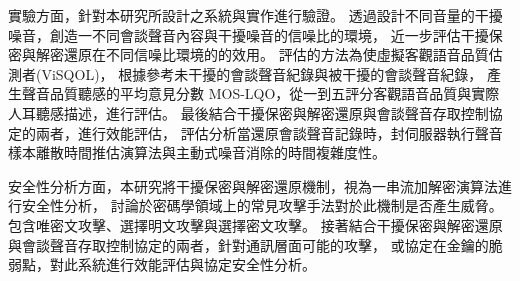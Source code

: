     實驗方面，針對本研究所設計之系統與實作進行驗證。
透過設計不同音量的干擾噪音，創造一不同會談聲音內容與干擾噪音的信噪比的環境，
近一步評估干擾保密與解密還原在不同信噪比環境的的效用。
評估的方法為使虛擬客觀語音品質估測者(ViSQOL)，
根據參考未干擾的會談聲音紀錄與被干擾的會談聲音紀錄，
產生聲音品質聽感的平均意見分數 MOS-LQO，從一到五評分客觀語音品質與實際人耳聽感描述，進行評估。
最後結合干擾保密與解密還原與會談聲音存取控制協定的兩者，進行效能評估，
評估分析當還原會談聲音記錄時，封伺服器執行聲音樣本離散時間推估演算法與主動式噪音消除的時間複雜度性。

    安全性分析方面，本研究將干擾保密與解密還原機制，視為一串流加解密演算法進行安全性分析，
討論於密碼學領域上的常見攻擊手法對於此機制是否產生威脅。
包含唯密文攻擊、選擇明文攻擊與選擇密文攻擊。
接著結合干擾保密與解密還原與會談聲音存取控制協定的兩者，針對通訊層面可能的攻擊，
或協定在金鑰的脆弱點，對此系統進行效能評估與協定安全性分析。